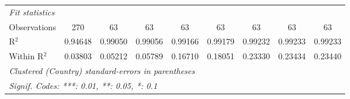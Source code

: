 \begin{table}[htbp]
\begin{tabular}{lcccccccc}
      \midrule
      \emph{Fit statistics}\\
      Observations                                            & 270             & 63       & 63       & 63           & 63           & 63            & 63           & 63\\  
      R$^2$                                                   & 0.94648         & 0.99050  & 0.99056  & 0.99166      & 0.99179      & 0.99232       & 0.99233      & 0.99233\\  
      Within R$^2$                                            & 0.03803         & 0.05212  & 0.05789  & 0.16710      & 0.18051      & 0.23330       & 0.23434      & 0.23440\\  
      \midrule \midrule
      \multicolumn{9}{l}{\emph{Clustered (Country) standard-errors in parentheses}}\\
      \multicolumn{9}{l}{\emph{Signif. Codes: ***: 0.01, **: 0.05, *: 0.1}}\\
   \end{tabular}
\end{table}


